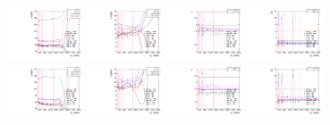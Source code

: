 \begin{figure}[htbp]
  \centering
  \includegraphics[width=0.2\textwidth]{fig/analysisAppendix/paramSignalShape_allSig_MJJ_HP_bb_HDy_mean.pdf}
  \includegraphics[width=0.2\textwidth]{fig/analysisAppendix/paramSignalShape_allSig_MJJ_HP_bb_HDy_sigma.pdf}
  \includegraphics[width=0.2\textwidth]{fig/analysisAppendix/paramSignalShape_allSig_MJJ_HP_bb_HDy_alpha.pdf}
  \includegraphics[width=0.2\textwidth]{fig/analysisAppendix/paramSignalShape_allSig_MJJ_HP_bb_HDy_alpha2.pdf}\\
  \includegraphics[width=0.2\textwidth]{fig/analysisAppendix/paramSignalShape_allSig_MJJ_LP_bb_HDy_mean.pdf}
  \includegraphics[width=0.2\textwidth]{fig/analysisAppendix/paramSignalShape_allSig_MJJ_LP_bb_HDy_sigma.pdf}
  \includegraphics[width=0.2\textwidth]{fig/analysisAppendix/paramSignalShape_allSig_MJJ_LP_bb_HDy_alpha.pdf}
  \includegraphics[width=0.2\textwidth]{fig/analysisAppendix/paramSignalShape_allSig_MJJ_LP_bb_HDy_alpha2.pdf}\\

\end{figure}
